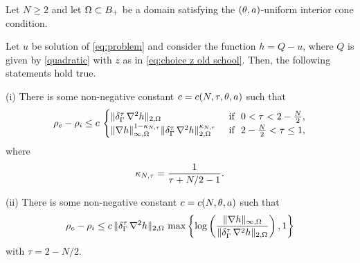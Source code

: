 \documentclass[a4paper,10pt]{amsart}
\numberwithin{equation}{section}
\begin{document}
%
%
%
\begin{thm}
\label{thm:oldschoolapproachW22_al<1}
Let $N\ge 2$ and let $\Omega \subset B_+$ be a domain satisfying the $(\theta, a)$-uniform interior cone condition. 
\par
Let $u$ be solution of \eqref{eq:problem} and consider the function $h=Q-u$, where $Q$ is given by \eqref{quadratic} with $z$ as in \eqref{eq:choice z old school}.
Then, the following statements hold true.
\par
(i) There is some non-negative constant $c= c(N, \tau, \theta , a )$ such that
\begin{equation}
\label{eq:N>_W22-oldapproac_al leq 1}
\rho_e-\rho_i\le c\,\begin{cases}
\nr \de_{\Ga}^{\tau} \, \na^2 h  \nr_{2,\Om}  &\mbox{ if } \ 0<\tau<2-\frac{N}{2}, \\
\nr\na h \nr_{ \infty , \Om}^{1-\ka_{N,\tau} } \nr \de_{\Ga}^{\tau} \,   \na^2 h  \nr_{2,\Om}^{\ka_{N,\tau}}  &\mbox{ if } \ 2-\frac{N}{2}<\tau\le 1, 
\end{cases} 
\end{equation}
where 
$$
\kappa_{N,\tau}=\frac1{\tau+N/2-1}.
$$
\par
(ii) There is some non-negative constant $c= c(N, \theta , a )$ such that
	\begin{equation}\label{eq:N=_W22-oldapproac_al leq 1}
		\rho_e-\rho_i\le c \, \Vert \delta_{\Gamma}^\tau \, \nabla^2 h  \Vert_{2,\Omega} \, \max \left\{ \log \left( \frac{ \Vert \nabla h \Vert_{\infty , \Omega} }{ \Vert \delta_{\Gamma}^\tau \, \nabla^2 h  \Vert_{2,\Omega} } \right) , 1 \right\}
\end{equation}
with $\tau=2-N/2$.
\end{thm}
\end{document}
